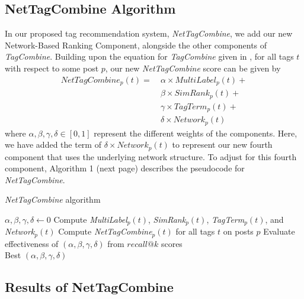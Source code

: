 \documentclass[10pt]{IEEEtran}
\begin{document}
\subsection{NetTagCombine Algorithm}

In our proposed tag recommendation system, \textit{NetTagCombine}, we add our new Network-Based Ranking Component, alongside the other components of \textit{TagCombine}. Building upon the equation for \textit{TagCombine} given in \cite{1}, for all tags $t$ with respect to some post $p$, our new \textit{NetTagCombine} score can be given by
\begin{align*}
NetTagCombine_p(t) =\ &\alpha \times MultiLabel_p(t) +\\
&\beta \times SimRank_p(t) +\\
&\gamma \times TagTerm_p(t) +\\
&\delta \times Network_p(t)
\end{align*}
where $\alpha,\beta,\gamma,\delta \in [0,1]$ represent the different weights of the components. Here, we have added the term of $\delta \times Network_p(t)$ to represent our new fourth component that uses the underlying network structure. To adjust for this fourth component, Algorithm 1 (next page) describes the pseudocode for \textit{NetTagCombine}.
\begin{algorithm*}
  \caption{\textit{NetTagCombine} algorithm}\label{ntc}
  \begin{algorithmic}[1]
    \State $\alpha, \beta, \gamma, \delta \gets 0$
        \State Compute \textit{MultiLabel}$_p(t)$, \textit{SimRank}$_p(t)$, \textit{TagTerm}$_p(t)$, and \textit{Network$_p(t)$}
      \EndFor
    \EndFor
            \State Compute \textit{NetTagCombine}$_p(t)$ for all tags $t$ on posts $p$
            \State Evaluate effectiveness of $(\alpha,\beta,\gamma,\delta)$ from $recall@k$ scores
          \EndFor
        \EndFor
      \EndFor
    \EndFor\\
    \Return Best $(\alpha,\beta,\gamma,\delta)$
  \end{algorithmic}
\end{algorithm*}

\subsection{Results of NetTagCombine}
\end{document}
